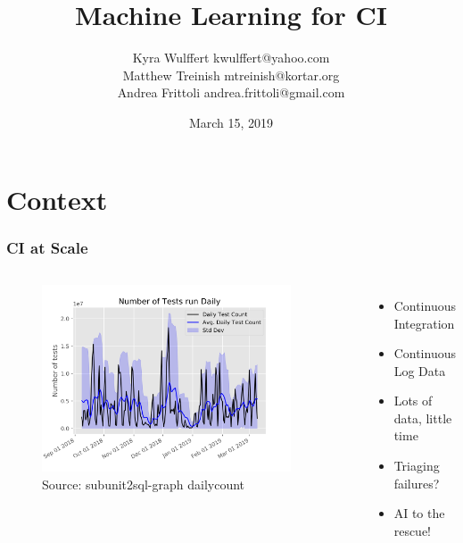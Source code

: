 \documentclass[aspectratio=169,11pt,hyperref={colorlinks=true}]{beamer}
\author[Kyra Matt Andrea]{%
\normalsize Kyra Wulffert \tiny kwulffert@yahoo.com \\
\normalsize Matthew Treinish \tiny mtreinish@kortar.org \\
\normalsize Andrea Frittoli \tiny andrea.frittoli@gmail.com \\
\normalsize
}
\date{March 15, 2019}
\title{Machine Learning for CI}
\institute[FOSSASIA]{
  FOSSASIA OpenTechSummit \\
  Singapore 2019\\
  Lifelong Learning Institute
}
\begin{document}
\begin{frame}[noframenumbering]
\titlepage{}
\end{frame}

\section{Context}

\begin{frame}
  \frametitle{CI at Scale}
  \begin{columns}
      \begin{figure}
      \begin{center}
        \includegraphics[width=0.9\textwidth]{graphs/daily_count.png}
           \caption{Source: subunit2sql-graph dailycount}
      \end{center}
      \end{figure}
      \begin{itemize}
          \item{Continuous Integration}
          \item{Continuous Log Data}
          \item{Lots of data, little time}
          \item{Triaging failures?}
          \item{AI to the rescue!}
      \end{itemize}
  \end{columns}
\end{frame}
\end{document}
